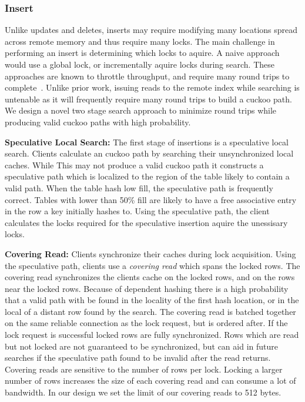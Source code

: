\subsubsection{Insert}
\label{sec:insert}

Unlike updates and deletes, inserts may require modifying
many locations spread across remote memory and thus require
many locks. The main challenge in performing an insert is
determining which locks to aquire. A naive approach would
use a global lock, or incrementally aquire locks during
search. These approaches are known to throttle throughput,
and require many round trips to
complete~\cite{cuckoo-improvements}. Unlike prior work,
issuing reads to the remote index while searching is
untenable as it will frequently require many round trips to
build a cuckoo path.  We design a novel two stage search
approach to minimize round trips while producing valid
cuckoo paths with high probability.

\textbf{Speculative Local Search:} The first stage of
insertions is a speculative local search. Clients calculate
an cuckoo path by searching their unsynchronized local
caches. While This may not produce a valid cuckoo path it
constructs a speculative path which is localized to the
region of the table likely to contain a valid path. When the
table hash low fill, the speculative path is frequently
correct. Tables with lower than 50\% fill are likely to have
a free associative entry in the row a key initially hashes
to.  Using the speculative path, the client calculates the
locks required for the speculative insertion aquire the
unessisary locks.

\textbf{Covering Read:} Clients synchronize their caches
during lock acquisition.  Using the speculative path,
clients use a \textit{covering read} which spans the locked
rows. The covering read synchronizes the clients cache on
the locked rows, and on the rows near the locked rows.
Because of dependent hashing there is a high probability
that a valid path with be found in the locality of the first
hash location, or in the local of a distant row found by the
search. The covering read is batched together on the same
reliable connection as the lock request, but is ordered
after. If the lock request is successful locked rows are
fully synchronized. Rows which are read but not locked are
not guaranteed to be synchronized, but can aid in future
searches if the speculative path found to be invalid after
the read returns. Covering reads are sensitive to the number
of rows per lock. Locking a larger number of rows increases
the size of each covering read and can consume a lot of
bandwidth. In our design we set the limit of our covering
reads to 512 bytes.

